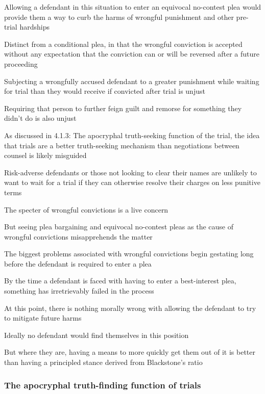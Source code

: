 Allowing a defendant in this situation to enter an equivocal no-contest plea would provide them a way to curb the harms of wrongful punishment and other pre-trial hardships

Distinct from a conditional plea, in that the wrongful conviction is accepted without any expectation that the conviction can or will be reversed after a future proceeding

Subjecting a wrongfully accused defendant to a greater punishment while waiting for trial than they would receive if convicted after trial is unjust

Requiring that person to further feign guilt and remorse for something they didn't do is also unjust

As discussed in 4.1.3: The apocryphal truth-seeking function of the trial, the idea that trials are a better truth-seeking mechanism than negotiations between counsel is likely misguided

Risk-adverse defendants or those not looking to clear their names are unlikely to want to wait for a trial if they can otherwise resolve their charges on less punitive terms

The specter of wrongful convictions is a live concern

But seeing plea bargaining and equivocal no-contest pleas as the cause of wrongful convictions misapprehends the matter

The biggest problems associated with wrongful convictions begin gestating long before the defendant is required to enter a plea

By the time a defendant is faced with having to enter a best-interest plea, something has irretrievably failed in the process

At this point, there is nothing morally wrong with allowing the defendant to try to mitigate future harms

Ideally no defendant would find themselves in this position

But where they are, having a means to more quickly get them out of it is better than having a principled stance derived from Blackstone's ratio

\subsubsection{The apocryphal truth-finding function of trials}

